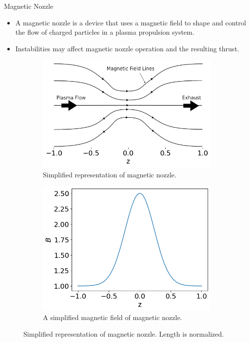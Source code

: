 \begin{frame}{Magnetic Nozzle}
  \begin{itemize}
    \item A magnetic nozzle is a device that uses a magnetic field to shape and control the flow of charged particles in a plasma propulsion system.
    \item Instabilities may affect magnetic nozzle operation and the resulting thrust. \cite{kaganovich_2020_physics}
  \end{itemize}
  \begin{figure}[htbp]
    \centering
    \begin{subfigure}{0.45\textwidth}
      \centering
      \includegraphics[width=0.8\linewidth]{figures/magnetic-nozzle}
      \caption{Simplified representation of magnetic nozzle.} 
    \end{subfigure}%
    \begin{subfigure}{0.45\textwidth}
      \centering
      \includegraphics[width=0.8\linewidth]{figures/magnetic-field}
      \caption{A simplified magnetic field of magnetic nozzle.} 
    \end{subfigure}
    \caption{Simplified representation of magnetic nozzle. Length is normalized.}
    \label{fig:magnetic-nozzle}
  \end{figure}
\end{frame}

